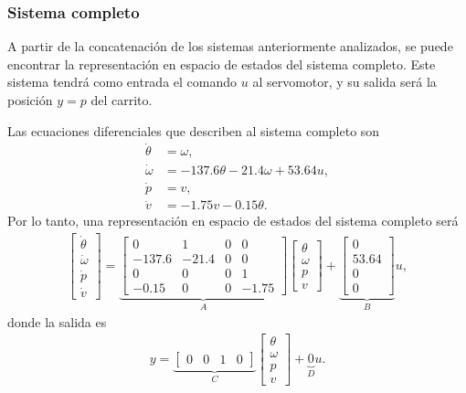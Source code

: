 \subsubsection{Sistema completo}

A partir de la concatenación de los sistemas anteriormente analizados, se puede encontrar la representación en espacio de estados del sistema completo. Este sistema tendrá como entrada el comando $u$ al servomotor, y su salida será la posición $y = p$ del carrito.

Las ecuaciones diferenciales que describen al sistema completo son
\begin{align*}
    \dot{\theta} &= \omega, \\
    \dot{\omega} &= -137.6 \theta - 21.4 \omega + 53.64 u, \\
    \dot{p} &= v, \\
    \dot{v} &= -1.75 v - 0.15 \theta.
\end{align*}
Por lo tanto, una representación en espacio de estados del sistema completo será
\begin{align*}
    \begin{bmatrix} \dot{\theta} \\ \dot{\omega} \\ \dot{p} \\ \dot{v} \end{bmatrix} =
        \underbrace{\begin{bmatrix}
            0 & 1 & 0 & 0 \\
            -137.6 & -21.4 & 0 & 0\\
            0 & 0 & 0 & 1 \\
            -0.15 & 0 & 0 & -1.75
        \end{bmatrix}}_{A} \begin{bmatrix} \theta \\ \omega \\ p \\ v \end{bmatrix}
            + \underbrace{\begin{bmatrix} 0 \\ 53.64 \\ 0 \\ 0 \end{bmatrix}}_{B} u,
\end{align*}
donde la salida es
\begin{align*}
    y = \underbrace{\begin{bmatrix} 0 & 0 & 1 & 0 \end{bmatrix}}_{C} \begin{bmatrix} \theta \\ \omega \\p \\ v \end{bmatrix} + \underbrace{0}_{D} u.
\end{align*}

